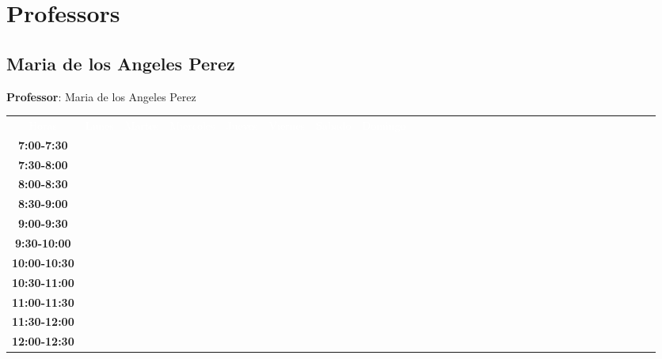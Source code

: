 \documentclass{article}
\begin{document}
\tableofcontents
\newpage


\section{Professors} 

\subsection{Maria de los Angeles Perez}
\vspace*{.1cm}

\begin{flushright}
{\LARGE \textbf{Professor}: Maria de los Angeles Perez}
\end{flushright}
\vspace{1cm}

\begin{table}[ht]\centering\small\begin{tabular}{|c|c|c|c|c|c|c|c|c|c|c|c|c|c|c|c|c|c|c|c|c|c|c|c|c|c|c|c|c|c|}\hline\cellcolor{black}\textcolor{white}{Horas} & \cellcolor{black}\textcolor{white}{ Lunes  } & \cellcolor{black}\textcolor{white}{ Martes } & \cellcolor{black}\textcolor{white}{Miercoles} & \cellcolor{black}\textcolor{white}{ Jueves } & \cellcolor{black}\textcolor{white}{ Viernes } & \cellcolor{black}\textcolor{white}{ Sabado } & \cellcolor{black}\textcolor{white}{ Domingo } \\
\cline{1-8} 
\textbf{7:00-7:30 } &   &   &   &   &   &   &   \\
\cline{1-8} 
\textbf{7:30-8:00} &   &   &   &   &   &   &   \\
\cline{1-8} 
\textbf{8:00-8:30} &   &   &   &   &   &   &   \\
\cline{1-8} 
\textbf{8:30-9:00} &   &   &   &   &   &   &   \\
\cline{1-8} 
\textbf{9:00-9:30} &   &   &   &   &   &   &   \\
\cline{1-8} 
\textbf{9:30-10:00} &   &   &   &   &   &   &   \\
\cline{1-8} 
\textbf{10:00-10:30} &   &   &   &   &   &   &   \\
\cline{1-8} 
\textbf{10:30-11:00} &   &   &   &   &   &   &   \\
\cline{1-8} 
\textbf{11:00-11:30} &   &   &   &   &   &   &   \\
\cline{1-8} 
\textbf{11:30-12:00} &   &   &   &   &   &   &   \\
\cline{1-8} 
\textbf{12:00-12:30} &   &   &   &   &   &   &   \\

\end{tabular}
\end{table}
\end{document}

